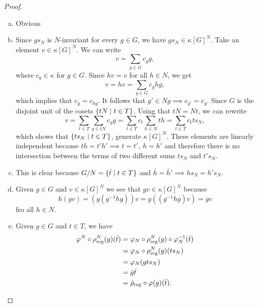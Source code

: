 \begin{proof}${}$
    \begin{enumerate}[a),font=\upshape]
        \item Obvious

        \item Since $gs_N$ is $N$-invariant for every $g\in G$, we have $gs_N\in\kappa[G]^N$. Take an element $v\in\kappa[G]^N$. We can write
        $$
            v = \sum_{g\in G}c_gg,
        $$
        where $c_g\in\kappa$ for $g\in G$. Since $hv=v$ for all $h\in N$, we get
        $$
            v = hv = \sum_{g\in G}c_ghg,
        $$
        which implies that $c_g=c_{hg}$. It follows that $g'\in Ng\implies c_{g'}=c_g$. Since $G$ is the disjoint unit of the cosets $\set{tN\mid t\in T}$. Using that $tN=Nt$, we can rewrite
        $$
            v = \sum_{t\in T}\sum_{g\in tN}c_gg
                = \sum_{t\in T}c_t\sum_{h\in N}th
                = \sum_{t\in T}c_tts_N,
        $$
        which shows that $\set{ts_N\mid t\in T}$, generate $\kappa[G]^N$. These elements are linearly independent because $th=t'h'\implies t=t',\ h=h'$ and therefore there is no intersection between the terms of two different sums $ts_N$ and $t's_N$.

        \item This is clear because $G/N=\set{\bar t\mid t\in T}$ and $\bar h=\bar h'\implies hs_N=h's_N$.

        \item Given $g\in G$ and $v\in\kappa[G]^N$ we see that $gv\in\kappa[G]^N$ because
        $$
            h(gv)=(g(g^{-1}hg))v = g((g^{-1}hg)v) = gv
        $$
        fro all $h\in N$.

        \item Given $g\in G$ and $t\in T$, we have
        \begin{align*}
            \varphi^N\circ\rrho[\rho^N](g)(\bar t)
                &= \varphi_N\circ\rrho[\rho^N](g)\circ\varphi_N^{-1}
                        (\bar t)\\
                &= \varphi_N\circ\rrho[\rho^N](g)(ts_N)\\
                &= \varphi_N(gts_N)\\
                &= \bar g\bar t\\
                &= \rrho[\bar\rho]\circ\varphi(g)(\bar t).
        \end{align*}
    \end{enumerate}
\end{proof}

